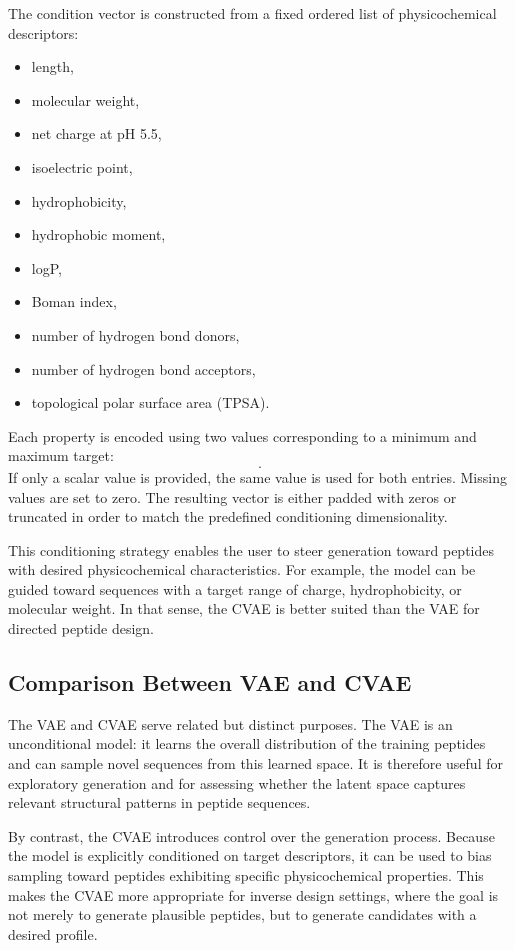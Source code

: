 The condition vector is constructed from a fixed ordered list of physicochemical descriptors:
\begin{itemize}
\item length,
\item molecular weight,
\item net charge at pH 5.5,
\item isoelectric point,
\item hydrophobicity,
\item hydrophobic moment,
\item logP,
\item Boman index,
\item number of hydrogen bond donors,
\item number of hydrogen bond acceptors,
\item topological polar surface area (TPSA).
\end{itemize}

Each property is encoded using two values corresponding to a minimum and maximum target:
\begin{equation}
[\text{min}, \text{max}].
\end{equation}
If only a scalar value is provided, the same value is used for both entries. Missing values are set to zero. The resulting vector is either padded with zeros or truncated in order to match the predefined conditioning dimensionality.

This conditioning strategy enables the user to steer generation toward peptides with desired physicochemical characteristics. For example, the model can be guided toward sequences with a target range of charge, hydrophobicity, or molecular weight. In that sense, the CVAE is better suited than the VAE for directed peptide design.

\subsection{Comparison Between VAE and CVAE}

The VAE and CVAE serve related but distinct purposes. The VAE is an unconditional model: it learns the overall distribution of the training peptides and can sample novel sequences from this learned space. It is therefore useful for exploratory generation and for assessing whether the latent space captures relevant structural patterns in peptide sequences.

By contrast, the CVAE introduces control over the generation process. Because the model is explicitly conditioned on target descriptors, it can be used to bias sampling toward peptides exhibiting specific physicochemical properties. This makes the CVAE more appropriate for inverse design settings, where the goal is not merely to generate plausible peptides, but to generate candidates with a desired profile.


